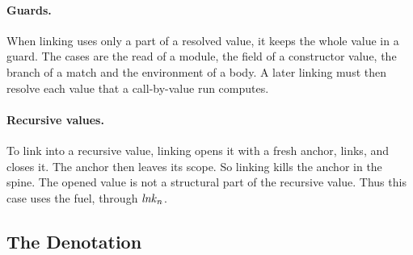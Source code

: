 \paragraph{Guards.}
When linking uses only a part of a resolved value, it keeps the whole value in a guard.
The cases are the read of a module, the field of a constructor value, the branch of a match and the environment of a body.
A later linking must then resolve each value that a call-by-value run computes.

\paragraph{Recursive values.}
To link into a recursive value, linking opens it with a fresh anchor, links, and closes it.
The anchor then leaves its scope.
So linking kills the anchor in the spine.
The opened value is not a structural part of the recursive value.
Thus this case uses the fuel, through $\mathit{lnk}_{n}$.

\subsection{The Denotation}

